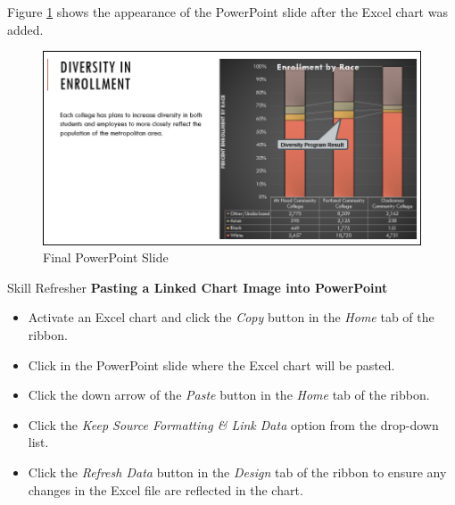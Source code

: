 Figure \ref{04:fig51} shows the appearance of the PowerPoint slide after the Excel chart was added. 

\begin{figure}[H]
	\centering
	\includegraphics[width=\maxwidth{.95\linewidth}]{gfx/ch04_fig51}
	\caption{Final PowerPoint Slide}
	\label{04:fig51}
\end{figure}

\begin{center}
	\begin{sklbox}{Skill Refresher}
		\textbf{Pasting a Linked Chart Image into PowerPoint}
		\\
		\begin{itemize}
			\setlength{\itemsep}{0pt}
			\setlength{\parskip}{0pt}
			\setlength{\parsep}{0pt}
			
			\item Activate an Excel chart and click the \textit{Copy} button in the \textit{Home} tab of the ribbon.
			\item Click in the PowerPoint slide where the Excel chart will be pasted.
			\item Click the down arrow of the \textit{Paste} button in the \textit{Home} tab of the ribbon.
			\item Click the \textit{Keep Source Formatting \& Link Data} option from the drop-down list.
			\item Click the \textit{Refresh Data} button in the \textit{Design} tab of the ribbon to ensure any changes in the Excel file are reflected in the chart.
			
		\end{itemize}
	\end{sklbox}
\end{center}

